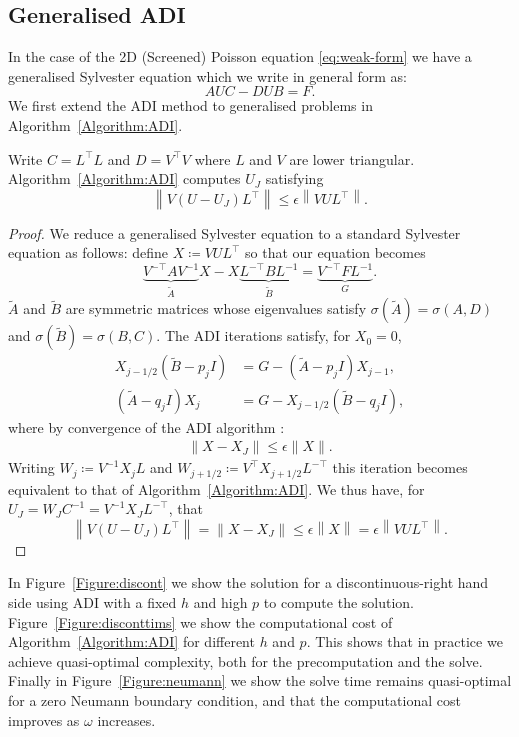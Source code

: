 \documentclass[hidelinks,onefignum,onetabnum]{siamart220329}
\def\norm#1{\left\| #1 \right\|}
\def\figref#1{Figure~\ref{Figure:#1}}
\def\algref#1{Algorithm~\ref{Algorithm:#1}}
\begin{document}
\subsection{Generalised ADI}

In the case of the 2D (Screened) Poisson equation \eqref{eq:weak-form} we have a generalised Sylvester equation which we write in general form as:
\[
	A U C - D U B = F.
\]
We first extend the ADI method to generalised problems in \algref{ADI}. 

\begin{lemma}
Write $C = L^\top L$ and $D = V^\top V$ where $L$ and $V$ are lower triangular.  \algref{ADI} computes $U_J$ satisfying 
\[
	\norm{V (U - U_J) L^\top} \leq \epsilon \norm{V U L^\top}.
\]

\end{lemma}
\begin{proof}
We reduce a generalised Sylvester equation to a standard Sylvester equation as follows:  define
$
X \coloneqq V U L^\top
$
so that our equation becomes
\[
	\underbrace{V^{-\top} A V^{-1}}_{\tilde A} X   -    X \underbrace{L^{-\top} B L^{-1}}_{\tilde B} = \underbrace{V^{-\top}  F L^{-1}}_G.
\]
$\tilde A$ and $\tilde B$ are symmetric matrices whose eigenvalues satisfy $\sigma(\tilde A) =  \sigma(A, D)$  and $\sigma(\tilde B) =  \sigma(B, C)$. The ADI iterations satisfy, for $X_0 = 0$,
\begin{align*}
X_{j-1/2} (\tilde B - p_j I) &= G - (\tilde A-p_jI) X_{j-1}, \\
(\tilde A-q_jI)X_{j} &= G - X_{j-1/2}(\tilde B-q_j I) ,
\end{align*}
where by convergence of the ADI algorithm \cite[Th.~2.1]{fortunato2020fast}:
\begin{align}
\| X - X_J \| \leq \epsilon \| X \|.
\label{eq:adi:8}
\end{align}
Writing $W_j \coloneqq V^{-1} X_j L$ and $W_{j+1/2} \coloneqq V^\top X_{j+1/2} L^{-\top}$ this iteration becomes equivalent to that of \algref{ADI}.  We thus have, for $U_J = W_J C^{-1} = V^{-1} X_J L^{-\top}$, that 
\[
	\norm{V (U - U_J) L^\top}  = \norm{X - X_J}  \leq \epsilon \norm{X} = \epsilon \norm{V U L^\top}.
\]





\end{proof}


In \figref{discont} we show the solution for a discontinuous-right hand side using ADI
with a fixed $h$ and high $p$ to compute the solution. \figref{disconttims} we show the
computational cost of \algref{ADI} for different $h$ and $p$. This shows that in practice
we achieve quasi-optimal complexity, both for the precomputation and the solve. Finally in \figref{neumann} we show the solve time remains quasi-optimal for a zero Neumann boundary condition, and that
the computational cost  improves as $\omega$ increases.
\end{document}
